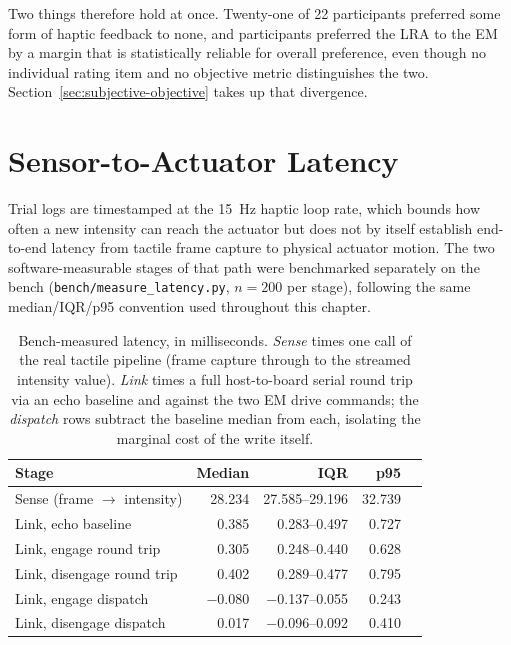 \documentclass[12pt, a4paper, twoside, openright]{report}
\begin{document}
Two things therefore hold at once. Twenty-one of 22 participants preferred some
form of haptic feedback to none, and participants preferred the LRA to the EM
by a margin that is statistically reliable for overall preference, even though
no individual rating item and no objective metric distinguishes the two.
Section~\ref{sec:subjective-objective} takes up that divergence.

\section{Sensor-to-Actuator Latency}
\label{sec:latency}

Trial logs are timestamped at the \SI{15}{\hertz} haptic loop rate, which
bounds how often a new intensity can reach the actuator but does not by itself
establish end-to-end latency from tactile frame capture to physical actuator
motion. The two software-measurable stages of that path were benchmarked
separately on the bench (\texttt{bench/measure\_latency.py}, $n=200$ per
stage), following the same median/IQR/p95 convention used throughout this
chapter.

\begin{table}[ht]
    \centering
    \caption{Bench-measured latency, in milliseconds. \emph{Sense} times one
        call of the real tactile pipeline (frame capture through to the
        streamed intensity value). \emph{Link} times a full host-to-board
        serial round trip via an echo baseline and against the two EM drive
        commands; the \emph{dispatch} rows subtract the baseline median from
        each, isolating the marginal cost of the write itself.}
    \label{tab:latency}
    \begin{tabular}{@{}lrrrr@{}}
        \toprule
        Stage                         & Median   & IQR             & p95    \\
        \midrule
        Sense (frame $\to$ intensity) & 28.234   & 27.585--29.196  & 32.739 \\
        \midrule
        Link, echo baseline           & 0.385    & 0.283--0.497    & 0.727  \\
        Link, engage round trip       & 0.305    & 0.248--0.440    & 0.628  \\
        Link, disengage round trip    & 0.402    & 0.289--0.477    & 0.795  \\
        Link, engage dispatch         & $-$0.080 & $-$0.137--0.055 & 0.243  \\
        Link, disengage dispatch      & 0.017    & $-$0.096--0.092 & 0.410  \\
        \bottomrule
    \end{tabular}
\end{table}
\end{document}
